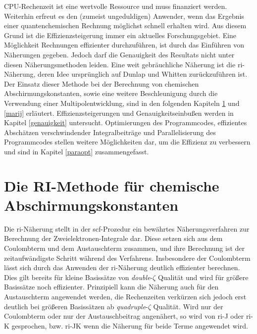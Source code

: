 CPU-Rechenzeit ist eine wertvolle Ressource und muss finanziert werden. Weiterhin erfreut es den (zumeist ungeduldigen) Anwender, wenn das Ergebnis einer quantenchemischen Rechnung möglichst schnell erhalten wird. Aus diesem Grund ist die Effizienzsteigerung immer ein aktuelles Forschungsgebiet. Eine Möglichkeit Rechnungen effizienter durchzuführen, ist durch das Einführen von Näherungen gegeben. Jedoch darf die Genauigkeit des Resultats nicht unter diesen Näherungsmethoden leiden. Eine weit gebräuchliche Näherung ist die \ac{ri}-Näherung\supercite{vahtras1993integral}, deren Idee ursprünglich auf Dunlap\supercite{dunlap1979some} und Whitten\supercite{whitten1973coulombic} zurückzuführen ist. Der Einsatz dieser Methode bei der Berechnung von chemischen Abschirmungskonstanten, sowie eine weitere Beschleunigung durch die Verwendung einer Multipolentwicklung, sind in den folgenden Kapiteln \ref{ri} und \ref{marij} erläutert. Effizienzsteigerungen und Genauigkeitseinbußen werden in Kapitel \ref{genauigkeit} untersucht. Optimierungen des Programmcodes, effizientes Abschätzen verschwindender Integralbeiträge und Parallelisierung des Programmcodes stellen weitere Möglichkeiten dar, um die Effizienz zu verbessern und sind in Kapitel \ref{paraopt} zusammengefasst. 

\section{Die RI-Methode für chemische Abschirmungskonstanten}\label{ri}
Die \ac{ri}-Näherung stellt in der \ac{scf}-Prozedur ein bewährtes Näherungsverfahren zur Berechnung der Zweielektronen-Integrale dar. Diese setzen sich aus dem Coulombterm und dem Austauschterm zusammen, und ihre Berechnung ist der zeitaufwändigste Schritt während des Verfahrens. Insbesondere der Coulombterm lässt sich durch das Anwenden der \ac{ri}-Näherung deutlich effizienter berechnen. Dies gilt bereits für kleine Basissätze von \textit{double}-$\zeta$ Qualität und wird für größere Basissätze noch effizienter. Prinzipiell kann die Näherung auch für den Austauschterm angewendet werden, die Rechenzeiten verkürzen sich jedoch erst deutlich bei größeren Basissätzen ab \textit{quadruple}-$\zeta$ Qualität. Wird nur der Coulombterm oder nur der Austauschbeitrag angenähert, so wird von \ac{ri}-J oder \ac{ri}-K gesprochen, bzw. \ac{ri}-JK wenn die Näherung für beide Terme angewendet wird. 

